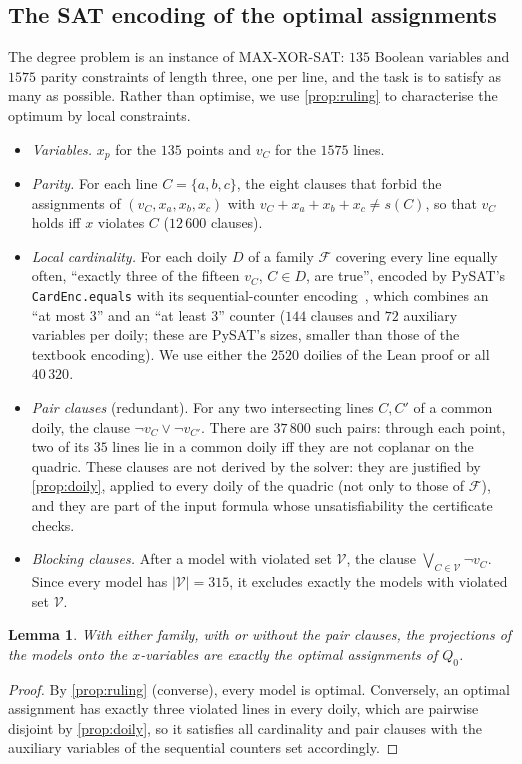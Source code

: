 \documentclass[11pt]{article}
\newtheorem{lemma}[lemma]{Lemma}
\theoremstyle{definition}
\theoremstyle{remark}
\begin{document}
\subsection{The SAT encoding of the optimal assignments}\label{sec:sat}
The degree problem is an instance of MAX-XOR-SAT: $135$ Boolean variables and $1575$ parity constraints of length three, one per line, and the task is to satisfy as many as possible.
Rather than optimise, we use \cref{prop:ruling} to characterise the optimum by local constraints.
\begin{itemize}[leftmargin=*]
\item \emph{Variables.} $x_p$ for the $135$ points and $v_C$ for the $1575$ lines.
\item \emph{Parity.} For each line $C=\{a,b,c\}$, the eight clauses that forbid the assignments of $(v_C,x_a,x_b,x_c)$ with $v_C+x_a+x_b+x_c\neq s(C)$, so that $v_C$ holds iff $x$ violates $C$ ($12\,600$ clauses).
\item \emph{Local cardinality.} For each doily $D$ of a family $\mathcal F$ covering every line equally often, ``exactly three of the fifteen $v_C$, $C\in D$, are true'', encoded by PySAT's \texttt{CardEnc.equals} with its sequential-counter encoding~\cite{Sinz05}, which combines an ``at most $3$'' and an ``at least $3$'' counter ($144$ clauses and $72$ auxiliary variables per doily; these are PySAT's sizes, smaller than those of the textbook encoding). We use either the $2520$ doilies of the Lean proof or all $40\,320$.
\item \emph{Pair clauses} (redundant). For any two intersecting lines $C,C'$ of a common doily, the clause $\neg v_C\vee\neg v_{C'}$. There are $37\,800$ such pairs: through each point, two of its $35$ lines lie in a common doily iff they are not coplanar on the quadric. These clauses are not derived by the solver: they are justified by \cref{prop:doily}, applied to every doily of the quadric (not only to those of $\mathcal F$), and they are part of the input formula whose unsatisfiability the certificate checks.
\item \emph{Blocking clauses.} After a model with violated set $\mathcal V$, the clause $\bigvee_{C\in\mathcal V}\neg v_C$. Since every model has $|\mathcal V|=315$, it excludes exactly the models with violated set $\mathcal V$.
\end{itemize}

\begin{lemma}\label{lem:encoding}
With either family, with or without the pair clauses, the projections of the models onto the $x$-variables are exactly the optimal assignments of $Q_0$.
\end{lemma}
\begin{proof}
By \cref{prop:ruling} (converse), every model is optimal. Conversely, an optimal assignment has exactly three violated lines in every doily, which are pairwise disjoint by \cref{prop:doily}, so it satisfies all cardinality and pair clauses with the auxiliary variables of the sequential counters set accordingly.
\end{proof}
\end{document}
